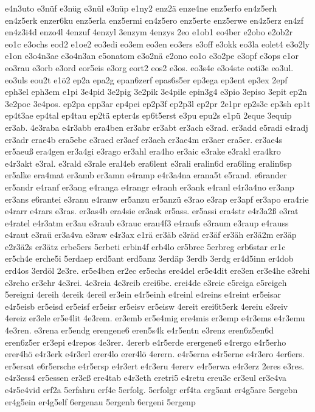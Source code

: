 {e4n3uto
e3nüf
e3nüg
e3nül
e3nüp
e1ny2
enz2ä
enze4ne
enz5erfo
en4z5erh
en4z5erk
enzer6ku
enz5erla
enz5ermi
en4z5ero
enz5erte
enz5erwe
en4z5erz
en4zf
en4z3i4d
enzo4l
4enzuf
4enzyl
3enzym
4enzys
2eo
e1ob1
eo4ber
e2obo
e2ob2r
eo1c
e3ochs
eod2
e1oe2
eo3edi
eo3em
eo3en
eo3ers
e3off
e3okk
eo3la
eolet4
e3o2ly
e1on
e3o4n3ae
e3o4n3an
e5onatom
e3o2nä
e2ono
eo1o
e3o2pe
e3opf
e3ops
e1or
eo3rau
e3orb
e3ord
eor5eis
e3org
eort2
eos2
e3os.
eo3s4e
e3o4ste
eoti3e
eo3ul.
eo3uls
eou2t
e1ö2
ep2a
epa2g
epan6zerf
epas6s5er
ep3ega
ep3ent
ep3ex
2epf
eph3el
eph3em
e1pi
3e4pid
3e2pig
3e2pik
3e4pile
epin3g4
e3pio
3episo
3epit
ep2n
3e2poc
3e4pos.
ep2pa
epp3ar
ep4pei
ep2p3f
ep2p3l
ep2pr
2e1pr
ep2s3c
ep3sh
ep1t
ep4t3ae
ep4tal
ep4tau
ep2tä
epter4s
ep6t5erst
e3pu
epu2s
e1pü
2eque
3equip
er3ab.
4e3raba
e4r3abb
era4ben
er3abr
er3abt
er3ach
e3rad.
er3add
e5radi
e4radj
er3adr
erae4b
era5ebe
e3raed
er3aef
er3aeh
er3ae4m
er3aer
era5er.
er3ae4s
er5aeuß
era4gen
er3a4gi
e3rago
er3ahl
era4ho
er3aic
e3rake
e3rakl
era4kro
e4r3akt
e3ral.
e3rald
e3rale
eral4eb
era6lent
e3rali
eralin6d
era6ling
eralin6sp
er5alke
era4mat
er3amb
er3amn
e4ramp
e4r3a4na
erana5t
e5rand.
e6rander
er5andr
e4ranf
er3ang
e4ranga
e4rangr
e4ranh
er3ank
e4ranl
e4r3a4no
er3anp
er3ans
e6rantei
e3ranu
e4ranw
er5anzu
er5anzü
e3rao
e3rap
er3apf
er3apo
era4rie
e4rarr
e4rars
e3ras.
er3as4b
era4sie
er3ask
er5ass.
er5assi
era4str
e4r3a2ß
e3rat
e4ratel
e4r3atm
er3au
e3raub
e3rauc
erau4f3
e4raufs
e3raum
e3raup
e4rauss
e4raut
e3raü
er3a4va
e3raw
e4r3ax
e1rä
er3äb
e3räd
er3äf
er3äh
er3ä2m
er3äp
e2r3ä2s
er3ätz
erbe5ers
5erbeti
erbin4f
erb4lo
er5brec
5erbreg
erb6star
er1c
er5ch4e
erche5i
5erdaep
erd5ant
erd5anz
3erdäp
3erdb
3erdg
er4d5inn
er4dob
erd4os
3erdöl
2e3re.
er5e4ben
er2ec
er5echs
ere4del
er5e4dit
ere3en
er3e4he
e3rehi
e3reho
er3ehr
4e3rei.
4e3reia
4e3reib
erei6be.
erei4de
e3reie
e5reiga
e5reigeh
5ereigni
4ereih
4ereik
4ereil
er3ein
e4r5einh
e4reinl
e4reins
e4reint
er5eisar
e4r5eisb
er5eisd
er5eisf
er5eisr
er5eisv
er5eisw
4ereit
erei6t5erk
4ereiu
e3reiv
4ereiz
er3ele
er5e4lit
4e3rem.
er3emb
er5e4mig
ere4mis
er3emp
e4r3ems
e4r3emu
4e3ren.
e3rena
er5endg
erengene6
eren5s4k
e4r5entn
e3renz
eren6z5en6d
eren6z5er
er3epi
e4repos
4e3rer.
4ererb
e4r5erde
erergene6
e4rergo
e4r5erho
erer4hö
e4r3erk
e4r3erl
erer4lo
erer4lö
4erern.
e4r5erna
e4r5erne
e4r3ero
4er6ers.
er5ersat
e6r5ersche
e4r5ersp
e4r3ert
e4r3eru
4ererv
e4r5erwa
e4r3erz
2eres
e3res.
e4r3ess4
er5essen
er3eß
ere4tab
e4r3eth
eretri5
e4retu
ereu3e
er3eul
er3e4va
e4r5e4vid
erf2a
5erfahru
erf4e
5erfolg.
5erfolgr
erf4ta
erg5ant
er4g5are
5ergebn
er4g5ein
er4g5elf
6ergenau
5ergenb
6ergeni
5ergenp
}
